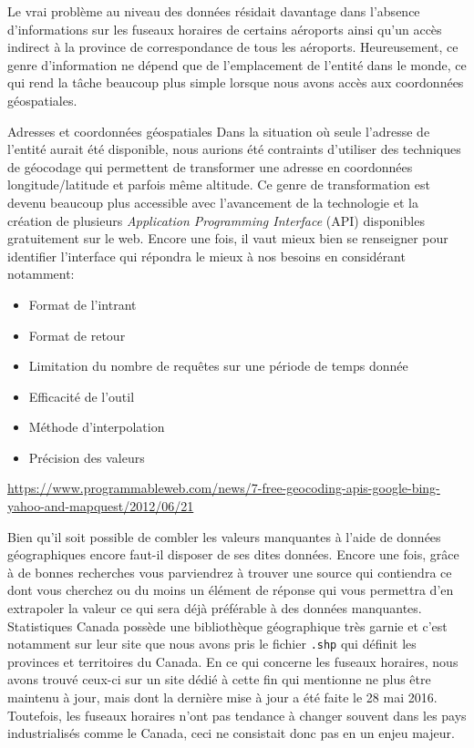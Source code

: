 Le vrai problème au niveau des données résidait davantage dans l'absence d'informations sur les fuseaux horaires de certains aéroports ainsi qu'un accès indirect à la province de correspondance de tous les aéroports. Heureusement, ce genre d'information ne dépend que de l'emplacement de l'entité dans le monde, ce qui rend la tâche beaucoup plus simple lorsque nous avons accès aux coordonnées géospatiales. \\

\begin{moreInfo}{Adresses et coordonnées géospatiales}
	Dans la situation où seule l'adresse de l'entité aurait été disponible, nous aurions été contraints d'utiliser des techniques de géocodage qui permettent de transformer une adresse en coordonnées longitude/latitude et parfois même altitude. Ce genre de transformation est devenu beaucoup plus accessible avec l'avancement de la technologie et la création de plusieurs \emph{Application Programming Interface} (API) disponibles gratuitement sur le web. Encore une fois, il vaut mieux bien se renseigner pour identifier l'interface qui répondra le mieux à nos besoins en considérant notamment:
	\begin{itemize}
		\item Format de l'intrant
		\item Format de retour
		\item Limitation du nombre de requêtes sur une période de temps donnée
		\item Efficacité de l'outil
		\item Méthode d'interpolation
		\item Précision des valeurs
	\end{itemize}
	\url{https://www.programmableweb.com/news/7-free-geocoding-apis-google-bing-yahoo-and-mapquest/2012/06/21}
\end{moreInfo}

Bien qu'il soit possible de combler les valeurs manquantes à l'aide de données géographiques encore faut-il disposer de ses dites données. Encore une fois, grâce à de bonnes recherches vous parviendrez à trouver une source qui contiendra ce dont vous cherchez ou du moins un élément de réponse qui vous permettra d'en extrapoler la valeur ce qui sera déjà préférable à des données manquantes. Statistiques Canada possède une bibliothèque géographique très garnie et c'est notamment sur leur site que nous avons pris le fichier \texttt{.shp} qui définit les provinces et territoires du Canada. \cite{Data:BoundaryFiles} En ce qui concerne les fuseaux horaires, nous avons trouvé ceux-ci sur un site dédié à cette fin qui mentionne ne plus être maintenu à jour, mais dont la dernière mise à jour a été faite le 28 mai 2016. Toutefois, les fuseaux horaires n'ont pas tendance à changer souvent dans les pays industrialisés comme le Canada, ceci ne consistait donc pas en un enjeu majeur. \cite{Data:tzWorldwide} \\

